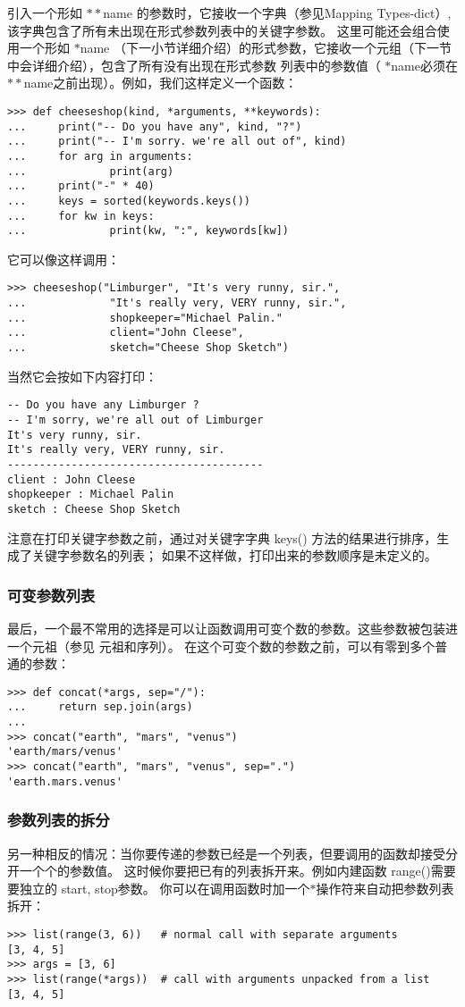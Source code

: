 \documentclass[UTF8]{ctexart}
\begin{document}
引入一个形如 $**$name 的参数时，它接收一个字典（参见Mapping Types-dict）,该字典包含了所有未出现在形式参数列表中的关键字参数。
这里可能还会组合使用一个形如 $*$name （下一小节详细介绍）的形式参数，它接收一个元组（下一节中会详细介绍），包含了所有没有出现在形式参数
列表中的参数值（ $*$name必须在 $**$name之前出现）。例如，我们这样定义一个函数：
\begin{verbatim}
>>> def cheeseshop(kind, *arguments, **keywords):
...     print("-- Do you have any", kind, "?")
...     print("-- I'm sorry. we're all out of", kind)
...     for arg in arguments:
...             print(arg)
...     print("-" * 40)
...     keys = sorted(keywords.keys())
...     for kw in keys:
...             print(kw, ":", keywords[kw])
\end{verbatim}

它可以像这样调用：
\begin{verbatim}
>>> cheeseshop("Limburger", "It's very runny, sir.",
...             "It's really very, VERY runny, sir.",
...             shopkeeper="Michael Palin."
...             client="John Cleese",
...             sketch="Cheese Shop Sketch")
\end{verbatim}

当然它会按如下内容打印：
\begin{verbatim}
-- Do you have any Limburger ?
-- I'm sorry, we're all out of Limburger
It's very runny, sir.
It's really very, VERY runny, sir.
----------------------------------------
client : John Cleese
shopkeeper : Michael Palin
sketch : Cheese Shop Sketch
\end{verbatim}

注意在打印关键字参数之前，通过对关键字字典 keys() 方法的结果进行排序，生成了关键字参数名的列表；
如果不这样做，打印出来的参数顺序是未定义的。

\subsubsection{可变参数列表}
最后，一个最不常用的选择是可以让函数调用可变个数的参数。这些参数被包装进一个元祖（参见 元祖和序列）。
在这个可变个数的参数之前，可以有零到多个普通的参数：
\begin{verbatim}
>>> def concat(*args, sep="/"):
...     return sep.join(args)
...
>>> concat("earth", "mars", "venus")
'earth/mars/venus'
>>> concat("earth", "mars", "venus", sep=".")
'earth.mars.venus'
\end{verbatim}
\subsubsection{参数列表的拆分}
另一种相反的情况：当你要传递的参数已经是一个列表，但要调用的函数却接受分开一个个的参数值。
这时候你要把已有的列表拆开来。例如内建函数 range()需要要独立的 start, stop参数。
你可以在调用函数时加一个$*$操作符来自动把参数列表拆开：
\begin{verbatim}
>>> list(range(3, 6))   # normal call with separate arguments
[3, 4, 5]
>>> args = [3, 6]
>>> list(range(*args))  # call with arguments unpacked from a list
[3, 4, 5]
\end{verbatim}
\end{document}
